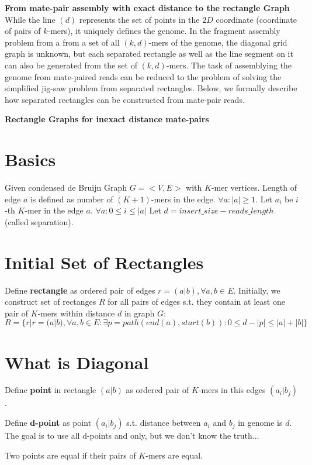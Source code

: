 \documentclass[a4paper]{article}
\begin{document}
\noindent
\textbf{From mate-pair assembly with exact distance to the rectangle Graph}
While the line $(d)$ represents the 
set of points in the $2D$ coordinate (coordinate of pairs of $k$-mers), it uniquely defines the genome.
In the fragment assembly problem from a from a set of all $(k,d)$-mers of the genome, 
the diagonal grid graph is unknown, but each separated rectangle as well 
as the line segment on it can also be generated
from the set of $(k,d)$-mers. The task of assemblying the genome from mate-paired reads can be 
reduced to the problem of solving the simplified jig-saw problem from separated rectangles.
Below, we formally describe how separated rectangles can be constructed from mate-pair reads. 

\noindent
\textbf{Rectangle Graphs for inexact distance mate-pairs}



\section{Basics}

Given condensed de Bruijn Graph $G = <V,E>$ with $K$-mer vertices.
Length of edge $a$ is defined as number of $(K+1)$-mers in the edge. $\forall a: |a| \geq 1$.
Let $a_i$ be $i$-th $K$-mer in the edge $a$. $\forall a: 0 \leq i \leq |a|$
Let $d = insert\_size - reads\_length$ (called separation).
\section{Initial Set of Rectangles}
Define \textbf{rectangle} as ordered pair of edges $r = (a|b), \forall a, b \in E$.
Initially, we construct set of rectanges $R$ for all pairs of edges s.t. they contain at least one pair of $K$-mers within distance $d$ in graph $G$:
$$ R = \{ r | r = (a|b), \forall a, b \in E : \exists p = path(end(a), start(b)) : 0 \leq d - |p| \leq |a| + |b| \} $$

\section{What is Diagonal}

Define \textbf{point} in rectangle $(a|b)$ as ordered pair of $K$-mers in this edges $(a_i|b_j)$.

Define \textbf{d-point} as point $(a_i|b_j)$ s.t. distance between $a_i$ and $b_j$ in genome is $d$. The goal is to use all d-points and only, but we don't know the truth...

Two points are equal if their pairs of $K$-mers are equal.
\end{document}
